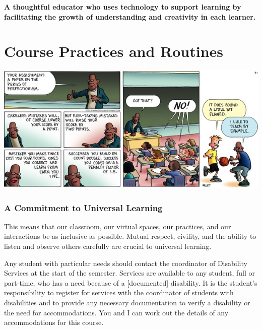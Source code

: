 \documentclass{tufte-handout}
\begin{document}
\begin{framed}
	\begin{center}
		\small\noindent\textbf{A thoughtful educator who uses technology to support learning by facilitating the growth of understanding and creativity in each learner.}
	\end{center}
\end{framed}

\normalsize

\newpage

\part{Course Practices and Routines}

\begin{marginfigure}%
	\begin{center}
  \includegraphics[width=1\linewidth]{frazz-mistakes.png}
  \label{fig:sc-pic}
	\end{center}
\end{marginfigure}

\section{A Commitment to Universal Learning}
 This means that our classroom, our virtual spaces, our practices, and our interactions be as inclusive as possible. Mutual respect, civility, and the ability to listen and observe others carefully are crucial to universal learning.

Any student with particular needs should contact the coordinator of Disability Services at the start of the semester. Services are available to any student, full or part-time, who has a need because of a [documented] disability. It is the student's responsibility to register for services with the coordinator of students with disabilities and to provide any necessary documentation to verify a disability or the need for accommodations.  You and I can work out the details of any accommodations for this course.
\end{document}
